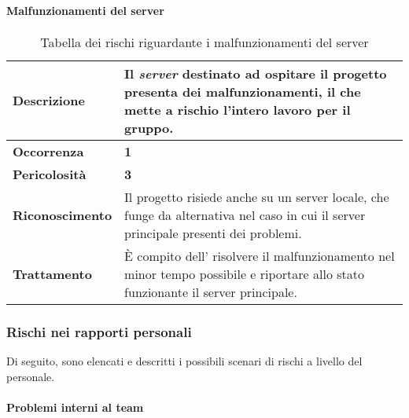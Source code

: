 \paragraph{Malfunzionamenti del server}

\begin{table}[H]
	\begin{center}
		\begin{tabular}{|l | p{11cm}|}
			\hline
			\textbf{Descrizione}	& Il \textit{server\ped{G}} destinato ad ospitare il progetto presenta dei malfunzionamenti, il che mette a rischio l'intero lavoro per il gruppo. \\
			\hline
			\textbf{Occorrenza}	&	\textbf{1}	\\
			\hline
			\textbf{Pericolosità}	&	\textbf{3}	\\
			\hline
			\textbf{Riconoscimento}	&	Il progetto risiede anche su un server locale, che funge da alternativa nel caso in cui il server principale presenti dei problemi.	\\
			\hline
			\textbf{Trattamento}	&	\MakeUppercase{è} compito dell'\textit{\Amm} risolvere il malfunzionamento nel minor tempo possibile e riportare allo stato funzionante il server principale.	\\
			\hline
		\end{tabular}
		\caption{Tabella dei rischi riguardante i malfunzionamenti del server}
	\end{center}
\end{table}


\subsubsection{Rischi nei rapporti personali}

Di seguito, sono elencati e descritti i possibili scenari di rischi a livello del personale.

\paragraph{Problemi interni al team}

